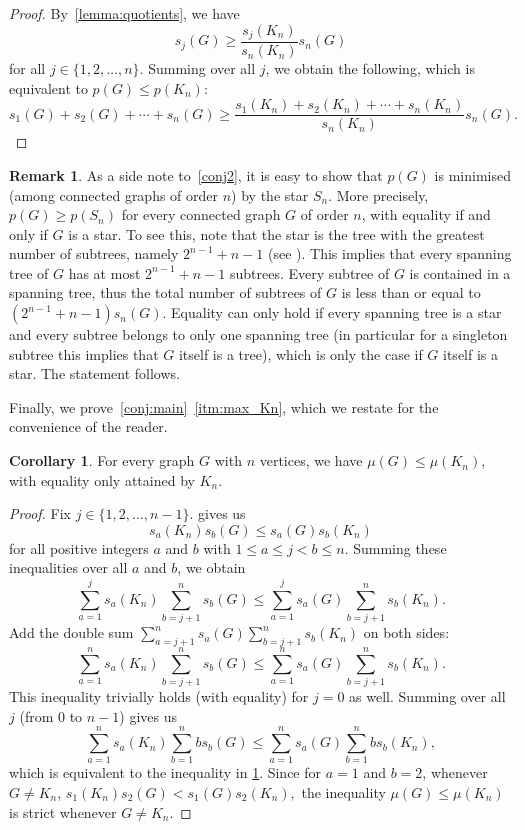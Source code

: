 \documentclass[11pt]{article}
\theoremstyle{definition}
\newtheorem{cor}[thr]{Corollary}
\newtheorem{remark}[thr]{Remark}
\begin{document}
\begin{proof}
By~\cref{lemma:quotients}, we have
$$s_j(G) \ge \frac{s_j(K_n)}{s_n(K_n)} s_n(G)$$
for all $j \in \{1,2,\ldots,n\}$. Summing over all $j$, we obtain the following, which is equivalent to $p(G) \le p(K_n)$:
$$s_1(G) + s_2(G) + \cdots + s_n(G) \ge \frac{s_1(K_n)+s_2(K_n) + \cdots + s_n(K_n)}{s_n(K_n)} s_n(G).$$
\end{proof}



\begin{remark}
 As a side note to~\cref{conj2}, it is easy to show that $p(G)$ is minimised (among connected graphs of order $n$) by the star $S_n$.
 More precisely, $p(G) \ge p(S_n)$ for every connected graph $G$ of order $n$, with equality if and only if $G$ is a star.
 To see this, note that the star is the tree with the greatest number of subtrees, namely $2^{n-1}+n-1$ (see \cite[Theorem 3.1]{SW05}). This implies that every spanning tree of $G$ has at most $2^{n-1}+n-1$ subtrees. Every subtree of $G$ is contained in a spanning tree, thus the total number of subtrees of $G$ is less than or equal to $(2^{n-1}+n-1)s_n(G)$. Equality can only hold if every spanning tree is a star and every subtree belongs to only one spanning tree (in particular for a singleton subtree this implies that $G$ itself is a tree), which is only the case if $G$ itself is a star. The statement follows.
\end{remark}

Finally, we prove~\cref{conj:main}~\ref{itm:max_Kn}, which we restate for the convenience of the reader.

\begin{cor}\label{conj3}
For every graph $G$ with $n$ vertices, we have $\mu(G) \le \mu(K_n)$, with equality only attained by $K_n.$
\end{cor}

\begin{proof}
Fix $j \in \{1,2,\ldots,n-1\}$.  gives us
$$s_a(K_n) s_b(G) \le s_a(G) s_b(K_n)$$
for all positive integers $a$ and $b$ with $1 \le a \le j < b \le n$. Summing these inequalities over all $a$ and $b$, we obtain
$$\sum_{a=1}^j s_a(K_n) \sum_{b=j+1}^n s_b(G) \le \sum_{a=1}^j s_a(G) \sum_{b=j+1}^n s_b(K_n).$$
Add the double sum $\sum_{a=j+1}^n s_a(G) \sum_{b=j+1}^n s_b(K_n)$ on both sides:
$$\sum_{a=1}^n s_a(K_n) \sum_{b=j+1}^n s_b(G) \le \sum_{a=1}^n s_a(G) \sum_{b=j+1}^n s_b(K_n).$$
This inequality trivially holds (with equality) for $j=0$ as well. Summing over all $j$ (from $0$ to $n-1$) gives us
$$\sum_{a=1}^n s_a(K_n) \sum_{b=1}^n b s_b(G) \le \sum_{a=1}^n s_a(G) \sum_{b=1}^n b s_b(K_n),$$
which is equivalent to the inequality in \cref{conj3}.
Since for $a=1$ and $b=2$, whenever $G \not= K_n$, $s_1(K_n)s_2(G)< s_1(G)s_2(K_n),$ the inequality $\mu(G) \le \mu(K_n)$ is strict whenever $G\not=K_n.$
\end{proof}
\end{document}
